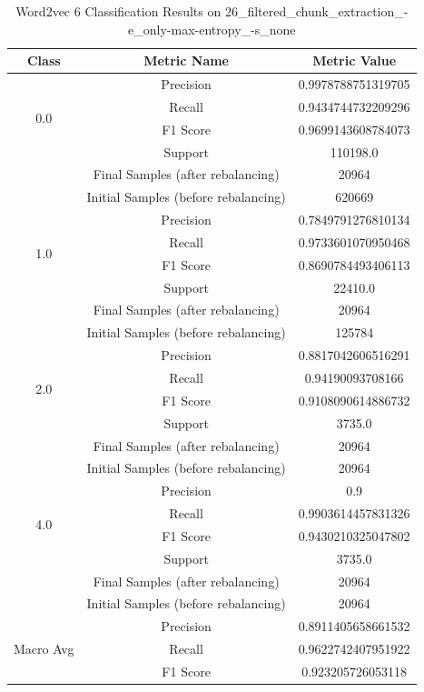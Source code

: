 \begin{longtable}{|c|c|c|}
\caption{Word2vec 6 Classification Results on 26\_filtered\_chunk\_extraction\_-e\_only-max-entropy\_-s\_none} \label{tab:26_filtered_chunk_extraction_-e_only-max-entropy_-s_none_word2vec_6_classifiers_results} \\
\hline
Class & Metric Name & Metric Value \\
\hline
\multirow{4}{*}{0.0} & Precision & 0.9978788751319705 \\
 & Recall & 0.9434744732209296 \\
 & F1 Score & 0.9699143608784073 \\
 & Support & 110198.0 \\
 & Final Samples (after rebalancing) & 20964 \\
 & Initial Samples (before rebalancing) & 620669 \\
\hline
\multirow{4}{*}{1.0} & Precision & 0.7849791276810134 \\
 & Recall & 0.9733601070950468 \\
 & F1 Score & 0.8690784493406113 \\
 & Support & 22410.0 \\
 & Final Samples (after rebalancing) & 20964 \\
 & Initial Samples (before rebalancing) & 125784 \\
\hline
\multirow{4}{*}{2.0} & Precision & 0.8817042606516291 \\
 & Recall & 0.94190093708166 \\
 & F1 Score & 0.9108090614886732 \\
 & Support & 3735.0 \\
 & Final Samples (after rebalancing) & 20964 \\
 & Initial Samples (before rebalancing) & 20964 \\
\hline
\multirow{4}{*}{4.0} & Precision & 0.9 \\
 & Recall & 0.9903614457831326 \\
 & F1 Score & 0.9430210325047802 \\
 & Support & 3735.0 \\
 & Final Samples (after rebalancing) & 20964 \\
 & Initial Samples (before rebalancing) & 20964 \\
\hline
\multirow{4}{*}{Macro Avg} & Precision & 0.8911405658661532 \\
 & Recall & 0.9622742407951922 \\
 & F1 Score & 0.923205726053118 \\

\end{longtable}

